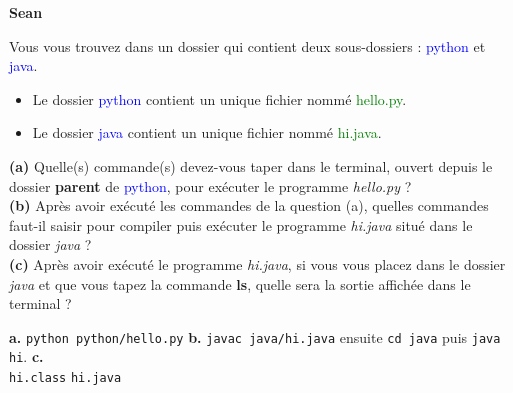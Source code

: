 \begin{Exercice}[10 minutes]\textbf{Sean}


Vous vous trouvez dans un dossier qui contient deux sous-dossiers : \faFolder[regular] \textcolor{blue}{python} et \faFolder[regular] \textcolor{blue}{java}.
\begin{itemize}
    \item[$\bullet$] Le dossier \textcolor{blue}{python} contient un unique fichier nommé \textcolor{green}{hello.py}.
    \item[$\bullet$] Le dossier \textcolor{blue}{java} contient un unique fichier nommé \textcolor{green}{hi.java}.
\end{itemize}

\textbf{(a)} Quelle(s) commande(s) devez-vous taper dans le terminal, ouvert depuis le dossier \textbf{parent} de \textcolor{blue}{python}, pour exécuter le programme \textit{hello.py} ? \\ 

\textbf{(b)} Après avoir exécuté les commandes de la question (a), quelles commandes faut-il saisir pour compiler puis exécuter le programme \textit{hi.java} situé dans le dossier \textit{java} ? \\ 

\textbf{(c)} Après avoir exécuté le programme \textit{hi.java}, si vous vous placez dans le dossier \textit{java} et que vous tapez la commande \textbf{ls}, quelle sera la sortie affichée dans le terminal ?

\begin{solution}
\textbf{a.} \texttt{python python/hello.py} \newline 
\textbf{b.} \texttt{javac java/hi.java} ensuite \texttt{cd java} puis  \texttt{java hi}. \newline 
\textbf{c.} \\
\texttt{hi.class} \newline \texttt{hi.java}  
\end{solution}





\end{Exercice}
